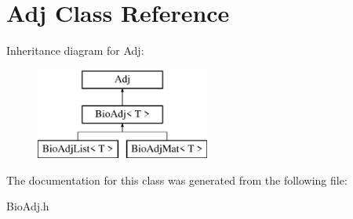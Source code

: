 \hypertarget{class_adj}{}\section{Adj Class Reference}
\label{class_adj}
Inheritance diagram for Adj\+:\begin{figure}[H]
\begin{center}
\leavevmode
\includegraphics[height=3.000000cm]{class_adj}
\end{center}
\end{figure}


The documentation for this class was generated from the following file\+:\begin{DoxyCompactItemize}
\item 
Bio\+Adj.\+h\end{DoxyCompactItemize}
